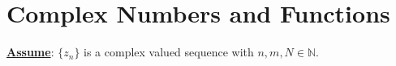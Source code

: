 \chapter{Complex Numbers and Functions}
\underline{\textbf{Assume}}: $\{ {z}_{n} \}$ is a complex valued sequence with $n,m, N \in \mathbb{N}$.




















